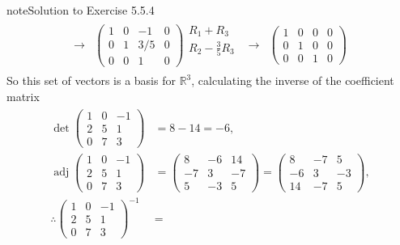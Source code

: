 \documentclass[letterpaper,10pt,english]{jupyterBook}
\begin{document}
\begin{sphinxadmonition}{note}{Solution to Exercise 5.5.4}
\begin{equation*}
\begin{split}
\begin{align*}
    \longrightarrow &
    \left( \begin{array}{ccc|c}
        1 & 0 & -1 & 0 \\
        0 & 1 & 3/5 & 0 \\
        0 & 0 & 1 & 0
    \end{array} \right)
    \begin{matrix} R_1 + R_3 \\ R_2 - \frac{3}{5}R_3 \\ \phantom{x} \end{matrix} &
    \longrightarrow &
    \left( \begin{array}{ccc|c}
        1 & 0 & 0 & 0 \\
        0 & 1 & 0 & 0 \\
        0 & 0 & 1 & 0
    \end{array} \right) 
\end{align*} \end{split}
\end{equation*}
\sphinxAtStartPar
So this set of vectors is a basis for \(\mathbb{R}^3\), calculating the inverse of the coefficient matrix
\begin{equation*}
\begin{split} \begin{align*}
    \det 
    \begin{pmatrix} 1 & 0 & -1 \\ 2 & 5 & 1 \\ 0 & 7 & 3 \end{pmatrix} &=
    8 - 14 = -6, \\
    \operatorname{adj}
    \begin{pmatrix} 1 & 0 & -1 \\ 2 & 5 & 1 \\ 0 & 7 & 3 \end{pmatrix} &=
    \begin{pmatrix} 8 & -6 & 14 \\ -7 & 3 & -7 \\ 5 & -3 & 5 \end{pmatrix} =
    \begin{pmatrix} 8 & -7 & 5 \\ -6 & 3 & -3 \\ 14 & -7 & 5 \end{pmatrix}, \\
    \therefore
    \begin{pmatrix} 1 & 0 & -1 \\ 2 & 5 & 1 \\ 0 & 7 & 3 \end{pmatrix}^{-1} &=

\end{align*}
\end{split}
\end{equation*}
\end{sphinxadmonition}
\end{document}
